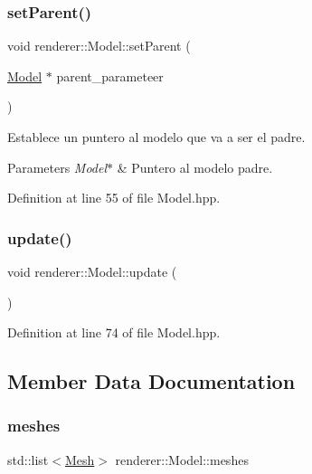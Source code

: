 \subsubsection{\texorpdfstring{setParent()}{setParent()}}
{\footnotesize\ttfamily void renderer\+::\+Model\+::set\+Parent (\begin{DoxyParamCaption}\item[{\mbox{\hyperlink{classrenderer_1_1_model}{Model}} $\ast$}]{parent\+\_\+parameteer }\end{DoxyParamCaption})\hspace{0.3cm}{\ttfamily [inline]}}

Establece un puntero al modelo que va a ser el padre. 
\begin{DoxyParams}{Parameters}
{\em Model$\ast$} & Puntero al modelo padre. \\
\hline
\end{DoxyParams}


Definition at line 55 of file Model.\+hpp.

\mbox{\label{classrenderer_1_1_model_a7773b13f4cd297edf1d11788066eb510}} 
\subsubsection{\texorpdfstring{update()}{update()}}
{\footnotesize\ttfamily void renderer\+::\+Model\+::update (\begin{DoxyParamCaption}{ }\end{DoxyParamCaption})\hspace{0.3cm}{\ttfamily [inline]}}



Definition at line 74 of file Model.\+hpp.



\subsection{Member Data Documentation}
\mbox{\label{classrenderer_1_1_model_abac271da33939950840f9ecf1b17b941}} 
\subsubsection{\texorpdfstring{meshes}{meshes}}
{\footnotesize\ttfamily std\+::list$<$\mbox{\hyperlink{classrenderer_1_1_mesh}{Mesh}}$>$ renderer\+::\+Model\+::meshes\hspace{0.3cm}{\ttfamily [private]}}

